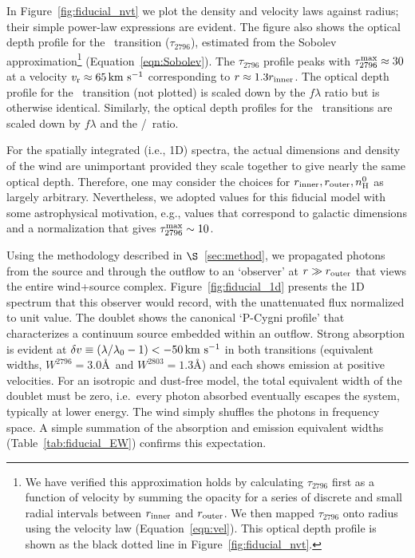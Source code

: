 \documentclass[12pt,preprint]{aastex}
\begin{document}
In Figure~\ref{fig:fiducial_nvt} we plot the density and velocity
laws against radius;  
their simple power-law expressions are evident.  The figure also
shows the optical depth profile for the \mgiia\ transition
($\tau_{2796}$), estimated from the Sobolev approximation\footnote{We
  have verified this approximation holds by calculating 
  $\tau_{2796}$ first
  as a function of velocity by summing the opacity for a series of
  discrete and small radial intervals
  between $r_{\rm inner}$  and $r_{\rm outer}$.   We then mapped
  $\tau_{2796}$ onto radius using the velocity law
  (Equation~\ref{eqn:vel}). This optical depth profile is shown as the
black dotted line in Figure~\ref{fig:fiducial_nvt}.}
(Equation~\ref{eqn:Sobolev}). 
The $\tau_{2796}$ profile peaks with $\tau_{2796}^{\rm max} \approx 30$
at a velocity $v_{\rm r} \approx 65 \, {\rm km~s^{-1}}$ corresponding to $r \approx 1.3
r_{\rm inner}$.  The optical depth profile for the \mgiib\ transition
(not plotted) is scaled down by the $f\lambda$ ratio but is otherwise identical.  Similarly,
the optical depth profiles for the \feiid\ transitions are
scaled down by $f \lambda$ and the \nfe/\nmg\ ratio.  

For the spatially integrated (i.e., 1D) spectra, the actual dimensions and density of the wind are
unimportant provided they scale together to give nearly the same
optical depth. Therefore, one may consider the choices for
$r_{\rm inner}, r_{\rm outer}, n_{\rm H}^0$ as largely arbitrary.
Nevertheless, we adopted values for this fiducial model with
some astrophysical motivation,  e.g., values that correspond to
galactic dimensions and a normalization that gives $\tau_{2796}^{\rm
  max} \sim 10$.


Using the methodology described in $\S$~\ref{sec:method}, we
propagated photons from the source and through the outflow to an
`observer' at $r \gg r_{\rm outer}$ that views the entire wind+source
complex.  Figure~\ref{fig:fiducial_1d} presents the 1D spectrum
that this observer would record, with the unattenuated flux
normalized to unit value.   The  doublet
shows the canonical `P-Cygni profile' that characterizes a continuum
source embedded within an outflow.  Strong absorption is evident at
$\delta v  \equiv (\lambda/\lambda_0 - 1) < -50 \, {\rm km~s^{-1}}$ in both transitions (equivalent widths, $W^{2796} =
3.0$\AA\ and $W^{2803} = 1.3$\AA) and each shows emission at
positive velocities.  For an isotropic and dust-free model, the
total equivalent width of the doublet must be zero,
i.e.\ every photon
absorbed eventually escapes the system, typically at lower
energy.  The wind simply shuffles the photons in frequency space.
A simple summation of the absorption and emission equivalent widths
(Table~\ref{tab:fiducial_EW}) confirms this expectation.
\end{document}
